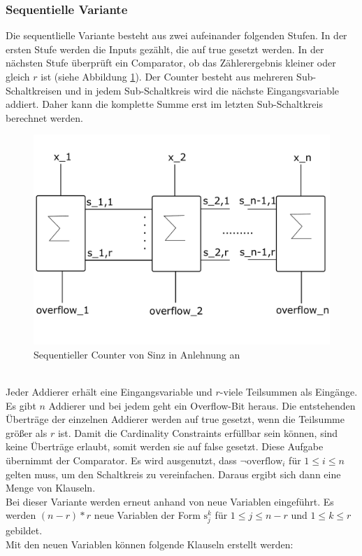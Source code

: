 \documentclass[a4,abstract=on]{scrartcl}
\begin{document}
		\subsubsection{Sequentielle Variante}
Die sequentlielle Variante besteht aus zwei aufeinander folgenden Stufen. In der ersten Stufe werden die Inputs gezählt, die auf true gesetzt werden. In der nächsten Stufe überprüft ein Comparator, ob das Zählerergebnis kleiner oder gleich $r$ ist (siehe Abbildung \ref{fig:sinz_counter}). Der Counter besteht aus mehreren Sub-Schaltkreisen und in jedem Sub-Schaltkreis wird die nächste Eingangsvariable addiert. Daher kann die komplette Summe erst im letzten Sub-Schaltkreis berechnet werden. \\


\begin{figure}[H]
\centering
\includegraphics[width=\textwidth]{Sinz_seq.pdf}
\caption{Sequentieller Counter von Sinz in Anlehnung an \cite[][] {sinz}}
\label{fig:sinz_counter}
\end{figure}
\ \\
Jeder Addierer erhält eine Eingangsvariable und $r$-viele Teilsummen als Eingänge. Es gibt $n$ Addierer und bei jedem geht ein Overflow-Bit heraus. Die entstehenden Überträge der einzelnen Addierer werden auf true gesetzt, wenn die Teilsumme größer als $r$ ist. Damit die Cardinality Constraints erfüllbar sein können, sind keine Überträge erlaubt, somit werden sie auf false gesetzt. Diese Aufgabe übernimmt der Comparator. Es wird ausgenutzt, dass $\neg \text{overflow}_i$ für $1 \leq i \leq n$ gelten muss, um den Schaltkreis zu vereinfachen. Daraus ergibt sich dann eine Menge von Klauseln.\\
Bei dieser Variante werden erneut anhand von \cite[][]{knuth} neue Variablen eingeführt. Es werden $(n-r)*r$ neue Variablen der Form $\text{s}_j^k$ für $1 \leq j \leq n - r$ und $1 \leq k \leq r$ gebildet. \\
Mit den neuen Variablen können folgende Klauseln erstellt werden:\\
\end{document}
